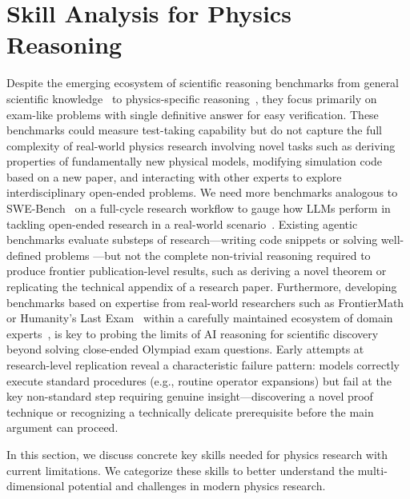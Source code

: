 \section{Skill Analysis for Physics Reasoning}
\label{sec:skill_analysis_physics}
Despite the emerging ecosystem of scientific reasoning benchmarks from general scientific knowledge~\cite{Hendrycks2021Measuring,Sun2023SciEval} to physics-specific reasoning~\cite{Chung2025Theoretical,Zhang2025PhysReason,Wang2024SciBench,seephys,wang2025cmphysbenchbenchmarkevaluatinglarge}, they focus primarily on exam-like problems with single definitive answer for easy verification. These benchmarks could measure test-taking capability but do not capture the full complexity of real-world physics research involving novel tasks such as deriving properties of fundamentally new physical models, modifying simulation code based on a new paper, and interacting with other experts to explore interdisciplinary open-ended problems. We need more benchmarks analogous to SWE-Bench~\cite{Jimenez2024SWEbench} on a full-cycle research workflow to gauge how LLMs perform in tackling open-ended research in a real-world scenario~\cite{Starace2025PaperBench,liu2025mimickingphysicistseyeavlmcentric,zheng2025newtonbenchbenchmarkinggeneralizablescientific,pan2026cmtbenchmark,wang2026cmphysbench}. Existing agentic benchmarks evaluate substeps of research---writing code snippets or solving well-defined problems ---but not the complete non-trivial reasoning required to produce frontier publication-level results, such as deriving a novel theorem or replicating the technical appendix of a research paper. Furthermore, developing benchmarks based on expertise from real-world researchers such as FrontierMath~\cite{Glazer2024FrontierMath} or Humanity's Last Exam~\cite{Phan2025Humanitys} within a carefully maintained ecosystem of domain experts~\cite{PathintegralInstitute2025Benchscience}, is key to probing the limits of AI reasoning for scientific discovery beyond solving close-ended Olympiad exam questions. Early attempts at research-level replication reveal a characteristic failure pattern: models correctly execute standard procedures (e.g., routine operator expansions) but fail at the key non-standard step requiring genuine insight---discovering a novel proof technique or recognizing a technically delicate prerequisite before the main argument can proceed.

In this section, we discuss concrete key skills needed for physics research with current limitations. We categorize these skills to better understand the multi-dimensional potential and challenges in modern physics research.

